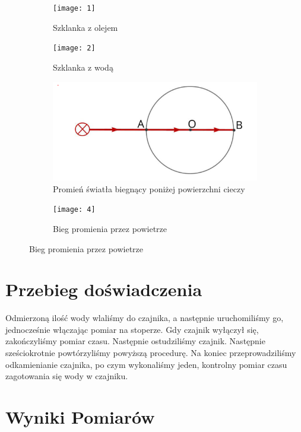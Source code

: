 \documentclass[]{article}
\begin{document}
\begin{figure}[H]
  \centering
  \begin{subfigure}[b]{0.4\linewidth}
    \texttt{[image: 1]}
    \caption{Szklanka z olejem}
  \end{subfigure}
  \begin{subfigure}[b]{0.4\linewidth}
    \texttt{[image: 2]}
    \caption{Szklanka z wodą}
  \end{subfigure}
  \begin{subfigure}[b]{0.4\linewidth}
    \includegraphics[width=\linewidth]{3}
    \caption{Promień światła biegnący
poniżej powierzchni cieczy }
  \end{subfigure}
  \begin{subfigure}[b]{0.4\linewidth}
    \texttt{[image: 4]}
    \caption{Bieg promienia przez powietrze}
  \end{subfigure}
  
\end{figure}




\section{Przebieg doświadczenia}
 Odmierzoną ilość wody wlaliśmy do czajnika, a następnie uruchomiliśmy go, jednocześnie włączając pomiar na stoperze. Gdy czajnik wyłączył się, zakończyliśmy pomiar czasu. Następnie ostudziliśmy czajnik. Następnie sześciokrotnie powtórzyliśmy powyższą procedurę. Na koniec przeprowadziliśmy odkamienianie czajnika, po czym wykonaliśmy jeden, kontrolny pomiar czasu zagotowania się wody w czajniku.

\newpage

\section{Wyniki Pomiarów}
\end{document}
